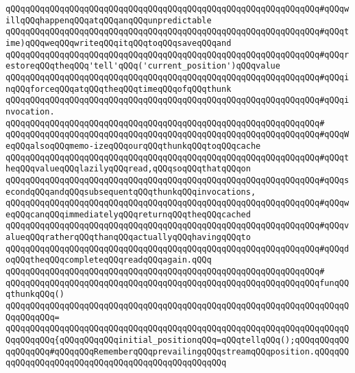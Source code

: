 \verb|qQQqqQQqqQQqqQQqqQQqqQQqqQQqqQQqqQQqqQQqqQQqqQQqqQQqqQQqqQQqqQQq#qQQqwillqQQqhappenqQQqatqQQqanqQQqunpredictable|\newline
\verb|qQQqqQQqqQQqqQQqqQQqqQQqqQQqqQQqqQQqqQQqqQQqqQQqqQQqqQQqqQQqqQQq#qQQqtime)qQQqweqQQqwriteqQQqitqQQqtoqQQqsaveqQQqand|\newline
\verb|qQQqqQQqqQQqqQQqqQQqqQQqqQQqqQQqqQQqqQQqqQQqqQQqqQQqqQQqqQQqqQQq#qQQqrestoreqQQqtheqQQq'tell'qQQq('current_position')qQQqvalue|\newline
\verb|qQQqqQQqqQQqqQQqqQQqqQQqqQQqqQQqqQQqqQQqqQQqqQQqqQQqqQQqqQQqqQQq#qQQqinqQQqforceqQQqatqQQqtheqQQqtimeqQQqofqQQqthunk|\newline
\verb|qQQqqQQqqQQqqQQqqQQqqQQqqQQqqQQqqQQqqQQqqQQqqQQqqQQqqQQqqQQqqQQq#qQQqinvocation.|\newline
\verb|qQQqqQQqqQQqqQQqqQQqqQQqqQQqqQQqqQQqqQQqqQQqqQQqqQQqqQQqqQQqqQQq#|\newline
\verb|qQQqqQQqqQQqqQQqqQQqqQQqqQQqqQQqqQQqqQQqqQQqqQQqqQQqqQQqqQQqqQQq#qQQqWeqQQqalsoqQQqmemo-izeqQQqourqQQqthunkqQQqtoqQQqcache|\newline
\verb|qQQqqQQqqQQqqQQqqQQqqQQqqQQqqQQqqQQqqQQqqQQqqQQqqQQqqQQqqQQqqQQq#qQQqtheqQQqvalueqQQqlazilyqQQqread,qQQqsoqQQqthatqQQqon|\newline
\verb|qQQqqQQqqQQqqQQqqQQqqQQqqQQqqQQqqQQqqQQqqQQqqQQqqQQqqQQqqQQqqQQq#qQQqsecondqQQqandqQQqsubsequentqQQqthunkqQQqinvocations,|\newline
\verb|qQQqqQQqqQQqqQQqqQQqqQQqqQQqqQQqqQQqqQQqqQQqqQQqqQQqqQQqqQQqqQQq#qQQqweqQQqcanqQQqimmediatelyqQQqreturnqQQqtheqQQqcached|\newline
\verb|qQQqqQQqqQQqqQQqqQQqqQQqqQQqqQQqqQQqqQQqqQQqqQQqqQQqqQQqqQQqqQQq#qQQqvalueqQQqratherqQQqthanqQQqactuallyqQQqhavingqQQqto|\newline
\verb|qQQqqQQqqQQqqQQqqQQqqQQqqQQqqQQqqQQqqQQqqQQqqQQqqQQqqQQqqQQqqQQq#qQQqdoqQQqtheqQQqcompleteqQQqreadqQQqagain.qQQq|\newline
\verb|qQQqqQQqqQQqqQQqqQQqqQQqqQQqqQQqqQQqqQQqqQQqqQQqqQQqqQQqqQQqqQQq#|\newline
\verb|qQQqqQQqqQQqqQQqqQQqqQQqqQQqqQQqqQQqqQQqqQQqqQQqqQQqqQQqqQQqqQQqfunqQQqthunkqQQq()|\newline
\verb|qQQqqQQqqQQqqQQqqQQqqQQqqQQqqQQqqQQqqQQqqQQqqQQqqQQqqQQqqQQqqQQqqQQqqQQqqQQqqQQq=|\newline
\verb|qQQqqQQqqQQqqQQqqQQqqQQqqQQqqQQqqQQqqQQqqQQqqQQqqQQqqQQqqQQqqQQqqQQqqQQqqQQqqQQq{qQQqqQQqqQQqinitial_positionqQQq=qQQqtellqQQq();qQQqqQQqqQQqqQQqqQQq#qQQqqQQqRememberqQQqprevailingqQQqstreamqQQqposition.qQQqqQQqqQQqqQQqqQQqqQQqqQQqqQQqqQQqqQQqqQQqqQQqqQQq|\newline
